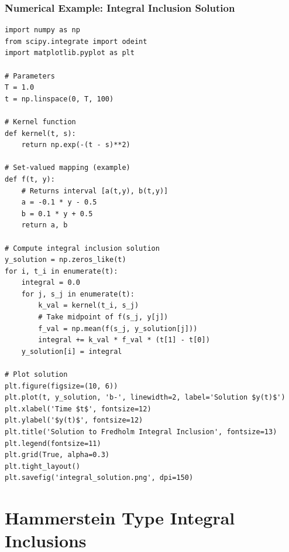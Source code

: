 \documentclass[aspectratio=169,10pt]{beamer}
\begin{document}
\begin{frame}[fragile]
\frametitle{Numerical Example: Integral Inclusion Solution}

\begin{lstlisting}
import numpy as np
from scipy.integrate import odeint
import matplotlib.pyplot as plt

# Parameters
T = 1.0
t = np.linspace(0, T, 100)

# Kernel function
def kernel(t, s):
    return np.exp(-(t - s)**2)

# Set-valued mapping (example)
def f(t, y):
    # Returns interval [a(t,y), b(t,y)]
    a = -0.1 * y - 0.5
    b = 0.1 * y + 0.5
    return a, b

# Compute integral inclusion solution
y_solution = np.zeros_like(t)
for i, t_i in enumerate(t):
    integral = 0.0
    for j, s_j in enumerate(t):
        k_val = kernel(t_i, s_j)
        # Take midpoint of f(s_j, y[j])
        f_val = np.mean(f(s_j, y_solution[j]))
        integral += k_val * f_val * (t[1] - t[0])
    y_solution[i] = integral

# Plot solution
plt.figure(figsize=(10, 6))
plt.plot(t, y_solution, 'b-', linewidth=2, label='Solution $y(t)$')
plt.xlabel('Time $t$', fontsize=12)
plt.ylabel('$y(t)$', fontsize=12)
plt.title('Solution to Fredholm Integral Inclusion', fontsize=13)
plt.legend(fontsize=11)
plt.grid(True, alpha=0.3)
plt.tight_layout()
plt.savefig('integral_solution.png', dpi=150)
\end{lstlisting}

\end{frame}


\section{Hammerstein Type Integral Inclusions}
\end{document}
